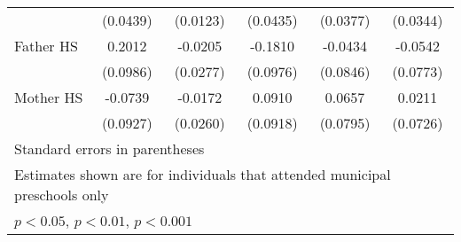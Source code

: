 \begin{table}[htbp]
\begin{tabular}{l*{5}{c}}
            &    (0.0439)         &    (0.0123)         &    (0.0435)         &    (0.0377)         &    (0.0344)         \\
\addlinespace
Father HS   &      0.2012\sym{*}  &     -0.0205         &     -0.1810         &     -0.0434         &     -0.0542         \\
            &    (0.0986)         &    (0.0277)         &    (0.0976)         &    (0.0846)         &    (0.0773)         \\
\addlinespace
Mother HS   &     -0.0739         &     -0.0172         &      0.0910         &      0.0657         &      0.0211         \\
            &    (0.0927)         &    (0.0260)         &    (0.0918)         &    (0.0795)         &    (0.0726)         \\
\bottomrule
\multicolumn{6}{l}{\footnotesize Standard errors in parentheses}\\
\multicolumn{6}{l}{\footnotesize Estimates shown are for individuals that attended municipal preschools only}\\
\multicolumn{6}{l}{\footnotesize \sym{*} \(p<0.05\), \sym{**} \(p<0.01\), \sym{***} \(p<0.001\)}\\
\end{tabular}
\end{table}
